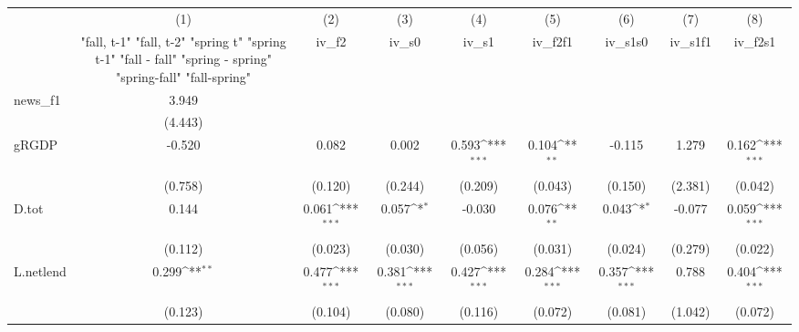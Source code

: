 {
\def\sym#1{\ifmmode^{#1}\else\(^{#1}\)\fi}
\begin{tabular}{l*{8}{c}}
\toprule
            &\multicolumn{1}{c}{(1)}&\multicolumn{1}{c}{(2)}&\multicolumn{1}{c}{(3)}&\multicolumn{1}{c}{(4)}&\multicolumn{1}{c}{(5)}&\multicolumn{1}{c}{(6)}&\multicolumn{1}{c}{(7)}&\multicolumn{1}{c}{(8)}\\
            &\multicolumn{1}{c}{  "fall, t-1" "fall, t-2" "spring t" "spring t-1"  "fall - fall" "spring - spring" "spring-fall" "fall-spring" }&\multicolumn{1}{c}{iv\_f2}&\multicolumn{1}{c}{iv\_s0}&\multicolumn{1}{c}{iv\_s1}&\multicolumn{1}{c}{iv\_f2f1}&\multicolumn{1}{c}{iv\_s1s0}&\multicolumn{1}{c}{iv\_s1f1}&\multicolumn{1}{c}{iv\_f2s1}\\
\midrule
news\_f1     &       3.949         &                     &                     &                     &                     &                     &                     &                     \\
            &     (4.443)         &                     &                     &                     &                     &                     &                     &                     \\
\addlinespace
gRGDP       &      -0.520         &       0.082         &       0.002         &       0.593\sym{***}&       0.104\sym{**} &      -0.115         &       1.279         &       0.162\sym{***}\\
            &     (0.758)         &     (0.120)         &     (0.244)         &     (0.209)         &     (0.043)         &     (0.150)         &     (2.381)         &     (0.042)         \\
\addlinespace
D.tot       &       0.144         &       0.061\sym{***}&       0.057\sym{*}  &      -0.030         &       0.076\sym{**} &       0.043\sym{*}  &      -0.077         &       0.059\sym{***}\\
            &     (0.112)         &     (0.023)         &     (0.030)         &     (0.056)         &     (0.031)         &     (0.024)         &     (0.279)         &     (0.022)         \\
\addlinespace
L.netlend   &       0.299\sym{**} &       0.477\sym{***}&       0.381\sym{***}&       0.427\sym{***}&       0.284\sym{***}&       0.357\sym{***}&       0.788         &       0.404\sym{***}\\
            &     (0.123)         &     (0.104)         &     (0.080)         &     (0.116)         &     (0.072)         &     (0.081)         &     (1.042)         &     (0.072)         \\

\end{tabular}}
